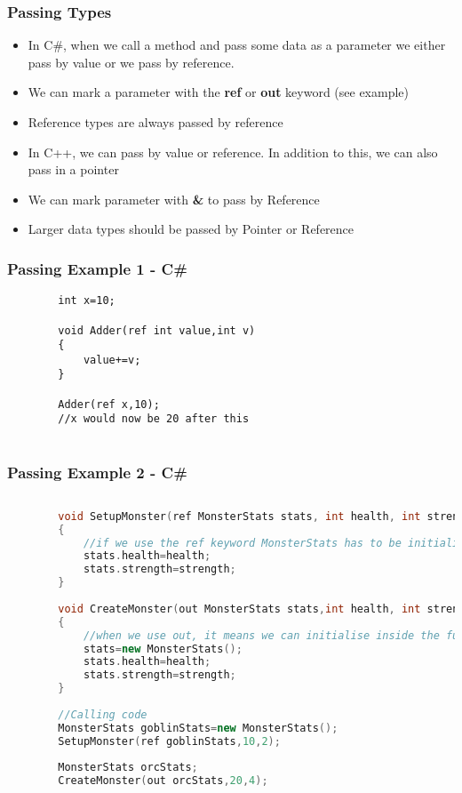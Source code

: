 \begin{frame}
\frametitle{Passing Types}
	\begin{itemize}
		\pause \item In C\#, when we call a method and pass some data as a parameter we either pass by value or we pass by reference. 
		\pause \item We can mark a parameter with the \textbf{ref} or \textbf{out} keyword (see example)
		\pause \item Reference types are always passed by reference
		\pause \item In C++, we can pass by value or reference. In addition to this, we can also pass in a pointer
		\pause \item We can mark parameter with \textbf{\&} to pass by Reference 
		\pause \item Larger data types should be passed by Pointer or Reference
	\end{itemize}
\end{frame}

\begin{frame}[fragile]
\frametitle{Passing Example 1 - C\#}
	\begin{lstlisting}
		int x=10;
		
		void Adder(ref int value,int v)
		{
			value+=v;	
		}
		
		Adder(ref x,10);
		//x would now be 20 after this		
	
	\end{lstlisting}
\end{frame}

\begin{frame}[fragile]
\frametitle{Passing Example 2 - C\#}
	\begin{lstlisting}[language=C++,basicstyle=\tiny,]
	
		void SetupMonster(ref MonsterStats stats, int health, int strength)
		{
			//if we use the ref keyword MonsterStats has to be initialised
			stats.health=health;
			stats.strength=strength;
		}
		
		void CreateMonster(out MonsterStats stats,int health, int strength)
		{
			//when we use out, it means we can initialise inside the function
			stats=new MonsterStats();
			stats.health=health;
			stats.strength=strength;
		}
		
		//Calling code
		MonsterStats goblinStats=new MonsterStats();
		SetupMonster(ref goblinStats,10,2);
		
		MonsterStats orcStats;
		CreateMonster(out orcStats,20,4);
	\end{lstlisting}
\end{frame}


